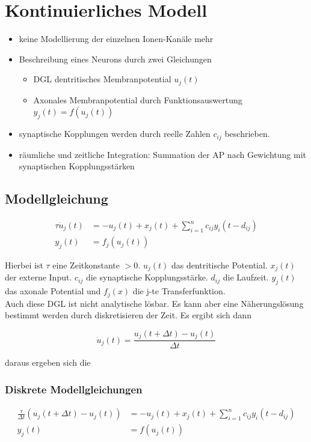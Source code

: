 \section{Kontinuierliches Modell}
\begin{itemize}
    \item keine Modellierung der einzelnen Ionen-Kanäle mehr
    \item Beschreibung eines Neurons durch zwei Gleichungen
        \begin{itemize}
            \item DGL dentritisches Membranpotential $u_j(t)$
            \item Axonales Membranpotential durch Funktionsauswertung $y_j(t)=f(u_j(t))$
        \end{itemize}
    \item synaptische Kopplungen werden durch reelle Zahlen $c_{ij}$ beschrieben.
    \item räumliche und zeitliche Integration: Summation der AP nach Gewichtung mit synaptischen Kopplungsstärken
\end{itemize}

\subsection{Modellgleichung}
\begin{align*}
    \tau \Dot{u}_j(t) & = -u_j(t) + x_j(t) + \sum_{i=1}^n c_{ij}y_i(t-d_{ij})\\
    y_j(t) &= f_j(u_j(t))
\end{align*}

Hierbei ist $\tau$ eine Zeitkonstante $>0$. $u_j(t)$ das dentritische Potential. $x_j(t)$ der externe Input. $c_{ij}$ die synaptische Kopplungsstärke. $d_{ij}$ die Laufzeit. $y_j(t)$ das axonale Potential und $f_j(x)$ die j-te Transferfunktion.\\

Auch diese DGL ist nicht analytische lösbar. Es kann aber eine Näherungslösung bestimmt werden durch diskretisieren der Zeit. Es ergibt sich dann

\begin{equation*}
    \Dot{u}_j(t) = \frac{u_j(t+\Delta t)-u_j(t)}{\Delta t}
\end{equation*}

daraus ergeben sich die 

\subsubsection{Diskrete Modellgleichungen}
\begin{align*}
    \frac{\tau}{\Delta t}(u_j(t+\Delta t)-u_j(t)) & = -u_j(t) + x_j(t) + \sum_{i=1}^n c_{ij}y_i(t-d_{ij})\\
    y_j(t) &= f(u_j(t))
\end{align*}

